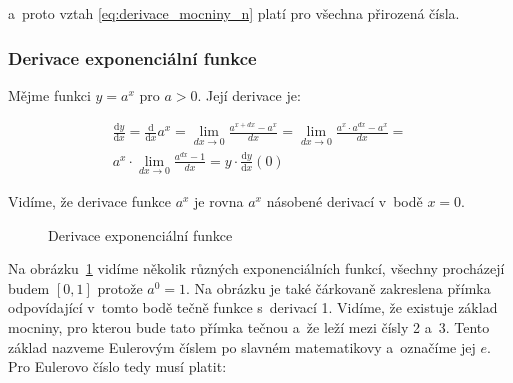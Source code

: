 a~proto vztah \eqref{eq:derivace_mocniny_n} platí pro všechna přirozená čísla.

\subsubsection{Derivace exponenciální funkce}

Mějme funkci \(y = a^x\) pro \(a > 0\). Její derivace je:

\begin{equation}
\begin{split}
\frac{\mathrm{d}y}{\mathrm{d}x} = \frac{\mathrm{d}}{\mathrm{d}x} a^x = \lim_{dx \to 0} \frac{a^{x+dx} - a^x}{dx} = \lim_{dx \to 0} \frac{a^x \cdot a^{dx} - a^x}{dx} = \\
a^x \cdot \lim_{dx \to 0} \frac{a^{dx} - 1}{dx} = y \cdot \frac{\mathrm{d}y}{\mathrm{d}x}(0)
\end{split}
\end{equation}

Vidíme, že derivace funkce \(a^x\) je rovna \(a^x\) násobené derivací v~bodě \(x = 0\).

\begin{figure}
\begin{center}
\caption{Derivace exponenciální funkce}
\end{center}
\label{img:derivace_exponencialni_funkce}
\end{figure}

Na obrázku~\ref{img:derivace_exponencialni_funkce} vidíme několik různých exponenciálních funkcí, všechny procházejí budem \([0, 1]\) protože \(a^0 = 1\). Na obrázku je také čárkovaně zakreslena přímka odpovídající v~tomto bodě tečně funkce s~derivací 1. Vidíme, že existuje základ mocniny, pro kterou bude tato přímka tečnou a~že leží mezi čísly 2 a~3. Tento základ nazveme Eulerovým číslem po slavném matematikovy a~označíme jej \(e\). Pro Eulerovo číslo tedy musí platit:

